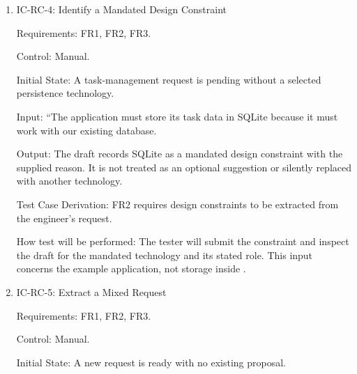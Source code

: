 \documentclass[12pt, titlepage]{article}
\begin{document}
\begin{enumerate}
Requirements: FR1, FR2, FR3; PUC2.

Control: Manual.

Initial State: A request includes a task search function but no response-time
target or workload conditions.

Input: ``Task searches should respond quickly.

Output: The system identifies a performance concern and asks for a measurable
expectation and relevant conditions. It does not silently assign a numerical
response-time target.

Test Case Derivation: FR2 and PUC2 require refinement of insufficiently
detailed quality needs into more precise information.

How test will be performed: The tester will submit the statement and inspect
the clarification questions and draft. A suggested target is acceptable only
if clearly presented for confirmation rather than treated as supplied intent.

\item{IC-RC-4: Identify a Mandated Design Constraint\\}

Requirements: FR1, FR2, FR3.

Control: Manual.

Initial State: A task-management request is pending without a selected
persistence technology.

Input: ``The application must store its task data in SQLite because it must
work with our existing database.

Output: The draft records SQLite as a mandated design constraint with the
supplied reason. It is not treated as an optional suggestion or silently
replaced with another technology.

Test Case Derivation: FR2 requires design constraints to be extracted from the
engineer's request.

How test will be performed: The tester will submit the constraint and inspect
the draft for the mandated technology and its stated role. This input concerns
the example application, not storage inside \progname{}.

\item{IC-RC-5: Extract a Mixed Request\\}

Requirements: FR1, FR2, FR3.

Control: Manual.

Initial State: A new request is ready with no existing proposal.


\end{enumerate}
\end{document}

